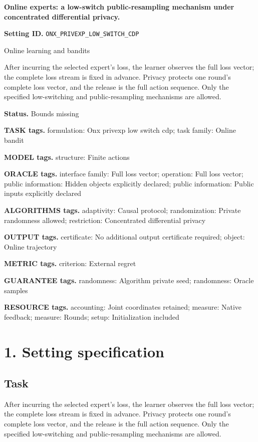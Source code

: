 \documentclass[10pt,a4paper]{article}
\begin{document}
\raggedright

{\LARGE\bfseries\sffamily\color{AtlasNavy} Online experts: a low-switch public-resampling mechanism under concentrated differential privacy.\par}\vspace{5pt}
\textbf{Setting ID.} \texttt{ONX\_\allowbreak{}PRIVEXP\_\allowbreak{}LOW\_\allowbreak{}SWITCH\_\allowbreak{}CDP}

Online learning and bandits

After incurring the selected expert's loss, the learner observes the full loss vector; the complete loss stream is fixed in advance. Privacy protects one round's complete loss vector, and the release is the full action sequence. Only the specified low-switching and public-resampling mechanisms are allowed.

\textbf{Status.} Bounds missing

\textbf{TASK tags.} formulation: Onx privexp low switch cdp; task family: Online bandit

\textbf{MODEL tags.} structure: Finite actions

\textbf{ORACLE tags.} interface family: Full loss vector; operation: Full loss vector; public information: Hidden objects explicitly declared; public information: Public inputs explicitly declared

\textbf{ALGORITHMS tags.} adaptivity: Causal protocol; randomization: Private randomness allowed; restriction: Concentrated differential privacy

\textbf{OUTPUT tags.} certificate: No additional output certificate required; object: Online trajectory

\textbf{METRIC tags.} criterion: External regret

\textbf{GUARANTEE tags.} randomness: Algorithm private seed; randomness: Oracle samples

\textbf{RESOURCE tags.} accounting: Joint coordinates retained; measure: Native feedback; measure: Rounds; setup: Initialization included

\section{1. Setting specification}
\subsection{Task}
After incurring the selected expert's loss, the learner observes the full loss vector; the complete loss stream is fixed in advance. Privacy protects one round's complete loss vector, and the release is the full action sequence. Only the specified low-switching and public-resampling mechanisms are allowed.
\end{document}
